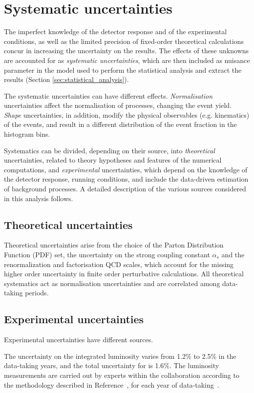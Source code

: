 \section{Systematic uncertainties}
\label{sec:systematics}
The imperfect knowledge of the detector response and of the experimental conditions, as well as the limited precision of fixed-order theoretical calculations concur in increasing the uncertainty on the results.
The effects of these unknowns are accounted for as \textit{systematic uncertainties}, which are then included as nuisance parameter in the model used to perform the statistical analysis and extract the results (Section \ref{sec:statistical_analysis}).

The systematic uncertainties can have different effects.
\textit{Normalisation} uncertainties affect the normalisation of processes, changing the event yield.
\textit{Shape} uncertainties, in addition, modify the physical observables (e.g. kinematics) of the events, and result in a different distribution of the event fraction in the histogram bins.

Systematics can be divided, depending on their source, into \textit{theoretical} uncertainties, related to theory hypotheses and features of the numerical computations, and \textit{experimental} uncertainties, which depend on the knowledge of the detector response, running conditions, and include the data-driven estimation of background processes.
A detailed description of the various sources considered in this analysis follows.

\subsection{Theoretical uncertainties}
Theoretical uncertainties arise from the choice of the Parton Distribution Function (PDF) set,
the uncertainty on the strong coupling constant $\alpha_s$ and
the renormalization and factorisation QCD scales, which account for the missing higher order uncertainty in finite order perturbative calculations.
All theoretical systematics act as normalisation uncertainties and are correlated among data-taking periods.

\subsection{Experimental uncertainties}
Experimental uncertainties have different sources.

The uncertainty on the integrated luminosity varies from 1.2\usep\% to 2.5\usep\% in the data-taking years, and the total uncertainty for \RunII is 1.6\usep\%.
The luminosity measurements are carried out by experts within the collaboration according to the methodology described in Reference~\cite{CMS:LUM-17-003},
for each year of data-taking~\cite{CMS:LUM-17-004, CMS:LUM-18-002}.

